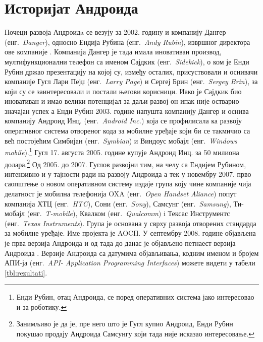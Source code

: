 \documentclass[12pt,oneside]{memoir}
\theoremstyle{remark}
\begin{document}
\section{Историјат Андроида}
Почеци развоја Андроидa се везују за 2002. годину и компанију Дангер (енг.~{\em Danger}), односно Ендија Рубина (енг.~{\em Andy Rubin}), извршног директора ове компаније \cite{paplukic}. Компанија Дангер је тада имала иновативан производ, мултифункционални телефон са именом Сајдкик (енг.~{\em Sidekick}), о ком је Енди Рубин држао презентацију на којој су, између осталих, присуствовали и оснивачи компаније Гугл Лари Пејџ  (енг.~{\em Larry Page}) и Сергеј Брин  (енг.~{\em Sergey Brin}), за који су се заинтересовали и постали његови корисници. Иако је Сајдкик био иновативан и имао велики потенцијал за даљи развој он ипак није остварио значајан успех а Енди Рубин 2003. године напушта компанију Дангер и оснива компанију Андроид Инц. (енг.~{\em Android Inc.})  која се профилисала ка развоју оперативног система отвореног кода за мобилне уређаје који би се такмичио са већ постојећим Симбијан (енг.~{\em Symbian}) и Виндоус мобајл (енг.~{\em Windows mobile}).\footnote{Енди Рубин, отац Андроида, се поред оперативних система јако интересовао и за роботику.} Гугл 17. августа 2005. године купује Андроид Инц.  за 50 милиона долара.\footnote{Занимљиво је да је, пре него што је Гугл купио Андроид, Енди Рубин покушао продају Андроида Самсунгу који тада није исказао интересовање. } Од 2005. до 2007. Гуглов развојни тим, на челу са Ендијем Рубином, интензивно и у тајности ради на развоју Андроида а тек у новембру 2007. прво саопштење о новом оперативном систему издаје група коју чине компаније чија делатност је мобилна телефонија OXA (енг.~{\em Open Handset Aliance}) попут компанија ХТЦ (енг.~{\em HTC}), Сони (енг.~{\em Sony}), Самсунг (енг.~{\em Samsung}), Ти-мобајл (енг.~{\em T-mobile}), Квалком (енг.~{\em Qualcomm}) i Тексас Инструментс (енг.~{\em Texas Instruments}). Група је основана у сврху развоја отворених стандарда за мобилне уређаје. Име пројекта је AOCП. У септембру 2008. године објављена је прва верзија Андроида и од тада до данас је објављено петнаест верзија Андроида \cite{historyandroid}. Верзије Андроида са датумима објављивања, кодним именом и бројем АПИ-ја (енг.~{\em API- Application Programming Interfaces}) можете видети у табели  \ref{tbl:rezultati}.
\end{document}
